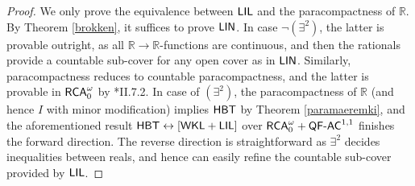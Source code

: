 \documentclass[reqno]{amsart}
\newtheorem{cor}[thm]{Corollary}
\def\RCAo{\textup{\textsf{RCA}}_{0}^{\omega}}
\def\WKL{\textup{\textsf{WKL}}}
\def\Q{{\mathbb  Q}}
\def\R{{\mathbb  R}}
\def\di{\rightarrow}
\def\asa{\leftrightarrow}
\def\QFAC{\textup{\textsf{QF-AC}}}
\def\HBT{\textup{\textsf{HBT}}}
\def\LIN{\textup{\textsf{LIN}}}
\def\LIL{\textup{\textsf{LIL}}}
\numberwithin{equation}{section}
\numberwithin{thm}{section}
\begin{document}
\begin{proof}
We only prove the equivalence between $\LIL$ and the paracompactness of $\R$. 
By Theorem \ref{brokken}, it suffices to prove $\LIN$.  
In case $\neg(\exists^{2})$, the latter is provable outright, as all $\R\di \R$-functions are continuous, and then the rationals provide a countable sub-cover for any open cover as in $\LIN$.
Similarly, paracompactness reduces to countable paracompactness, and the latter is provable in $\RCAo$ by \cite{simpson2}*{II.7.2}.
In case of $(\exists^{2})$, the paracompactness of $\R$ (and hence $I$ with minor modification) implies $\HBT$ by Theorem \ref{paramaeremki}, and the aforementioned result $\HBT\asa [\WKL+\LIL]$ over $\RCAo+\QFAC^{1,1}$ finishes the forward direction.  The reverse direction is straightforward as $\exists^{2}$ decides inequalities between reals, and hence can easily refine the countable sub-cover provided by $\LIL$.  
\end{proof}
%
%
\end{document}
